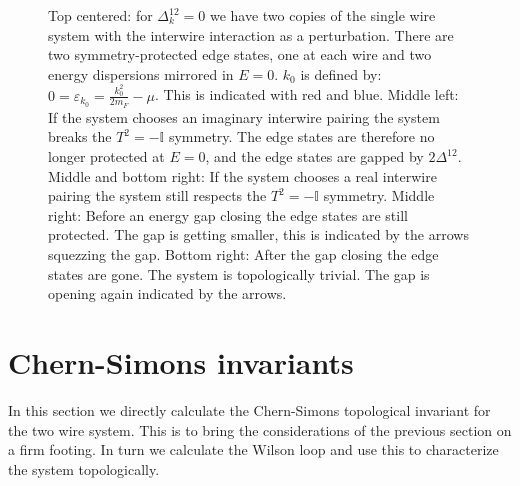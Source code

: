 \begin{figure}
\begin{tikzpicture}
\end{tikzpicture}
\caption{Top centered: for $\Delta^{12}_k=0$ we have two copies of the single wire system with the interwire interaction as a perturbation. There are two symmetry-protected edge states, one at each wire and two energy dispersions mirrored in $E = 0$. $k_0$ is defined by: $0 = \varepsilon_{k_0} = \frac{k^2_0}{2m_F} - \mu$. This is indicated with red and blue. Middle left: If the system chooses an imaginary interwire pairing the system breaks the $T^2 = -\mathbb{I}$ symmetry. The edge states are therefore no longer protected at $E = 0$, and the edge states are gapped by $2\Delta^{12}$. Middle and bottom right: If the system chooses a real interwire pairing the system still respects the $T^2 = -\mathbb{I}$ symmetry. Middle right: Before an energy gap closing the edge states are still protected. The gap is getting smaller, this is indicated by the arrows squezzing the gap. Bottom right: After the gap closing the edge states are gone. The system is topologically trivial. The gap is opening again indicated by the arrows.}
\label{fig.2wiresedgestates}
\end{figure}


\section{Chern-Simons invariants}
\label{sec.2wires_CSinv}
In this section we directly calculate the Chern-Simons topological invariant for the two wire system. This is to bring the considerations of the previous section on a firm footing. In turn we calculate the Wilson loop and use this to characterize the system topologically. 

